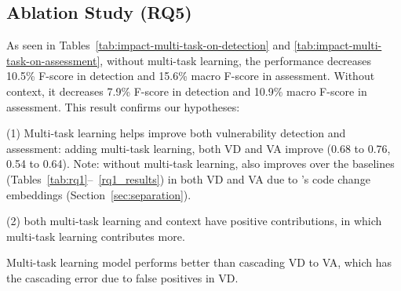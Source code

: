 \subsection{\bf Ablation Study (RQ5)}




As seen in Tables~\ref{tab:impact-multi-task-on-detection}
and \ref{tab:impact-multi-task-on-assessment}, without multi-task
learning, the performance decreases 10.5\% F-score in detection and 15.6\%
macro F-score in assessment. Without context, it decreases 7.9\%
F-score in detection and 10.9\% macro F-score in assessment.
This result confirms our hypotheses:

(1) Multi-task learning helps improve both vulnerability detection and
assessment: adding multi-task learning, both VD and VA improve (0.68
to 0.76, 0.54 to 0.64). Note: without multi-task learning, {\tool}
also improves over the baselines
(Tables~\ref{tab:rq1}--~\ref{rq1_results}) in both VD and VA due to
{\tool}'s code change embeddings
(Section~\ref{sec:separation}).


(2) both multi-task learning and context have positive contributions,
in which multi-task learning contributes more.

Multi-task learning model performs better than cascading VD to
VA, which has the cascading error due to false positives in VD.





